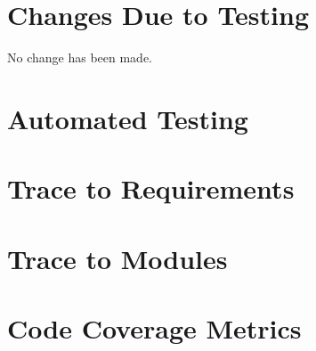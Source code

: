 \documentclass[12pt, titlepage]{article}
\begin{document}
\section{Changes Due to Testing}
No change has been made. 

\section{Automated Testing}
		
\section{Trace to Requirements}
		
\section{Trace to Modules}		

\section{Code Coverage Metrics}




\end{document}

